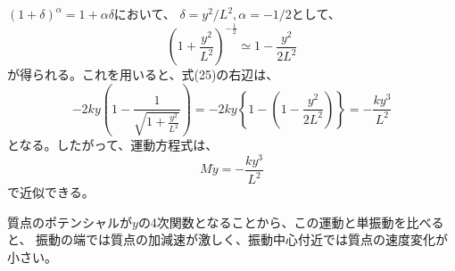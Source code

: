 \documentclass[a4paper]{jsarticle}
\begin{document}
\subsection{}
$(1 + \delta)^{\alpha} = 1 + \alpha \delta$において、
$\delta = y^2 / L^2, \alpha = -1/2$として、
\begin{equation}
  \left(1 + \frac{y^2}{L^2}\right)^{-\frac{1}{2}}
  \simeq 1 - \frac{y^2}{2 L^2}
\end{equation}
が得られる。これを用いると、式(25)の右辺は、
\begin{equation}
  -2 k y \left(1 - \frac{1}{\sqrt{1 + \frac{y^2}{L^2}}}\right)
  = -2 k y \left\{1 - \left(1 - \frac{y^2}{2 L^2}\right)\right\}
  = - \frac{k y^3}{L^2}
\end{equation}
となる。したがって、運動方程式は、
\begin{equation}
  M \ddot{y} =  - \frac{k y^3}{L^2}
\end{equation}
で近似できる。\par
質点のポテンシャルが$y$の4次関数となることから、この運動と単振動を比べると、
振動の端では質点の加減速が激しく、振動中心付近では質点の速度変化が小さい。
\end{document}
